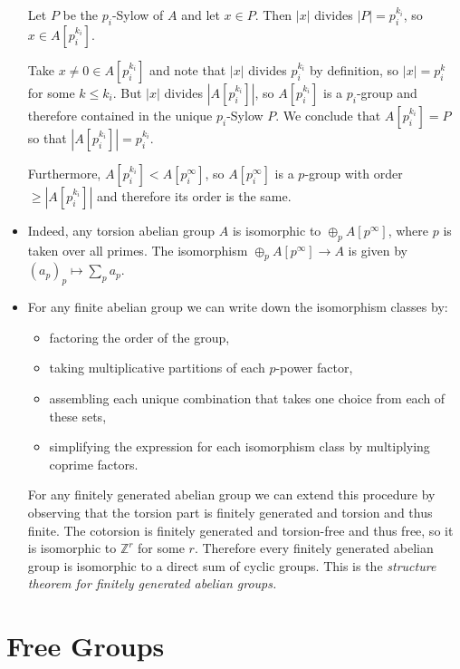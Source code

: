 \documentclass{article}
\begin{document}
\begin{itemize}
{    Let $P$ be the $p_i$-Sylow of $A$ and let $x \in P$. Then
    $|x|$ divides $|P| = p_i^{k_i}$, so $x \in A[p_i^{k_i}]$.

    Take $x \neq 0 \in A[p_i^{k_i}]$ and note that $|x|$ divides
    $p_i^{k_i}$ by definition, so $|x| = p_i^k$ for some
    $k \leq k_i$. But $|x|$ divides $|A[p_i^{k_i}]|$, so
    $A[p_i^{k_i}]$ is a $p_i$-group and therefore contained in the
    unique $p_i$-Sylow $P$. We conclude that $A[p_i^{k_i}] = P$ so
    that $|A[p_i^{k_i}]| = p_i^{k_i}$.

    Furthermore, $A[p_i^{k_i}] < A[p_i^\infty]$, so $A[p_i^\infty]$ is
    a $p$-group with order $\geq |A[p_i^{k_i}]|$ and therefore its
    order is the same.
  }
  \item{
    Indeed, any torsion abelian group $A$ is isomorphic to
    $\oplus_p A[p^\infty]$, where $p$ is taken over all primes. The
    isomorphism $\oplus_p A[p^\infty] \to A$ is given by
    $(a_p)_p \mapsto \sum_p a_p$.
  }
  \item{
    For any finite abelian group we can write down the isomorphism
    classes by:
    \begin{itemize}
      \item{factoring the order of the group,}
      \item{taking multiplicative partitions of each $p$-power
        factor,}
      \item{assembling each unique combination that takes one choice
        from each of these sets,}
      \item{simplifying the expression for each isomorphism class by
        multiplying coprime factors.}
    \end{itemize}

    For any finitely generated abelian group we can extend this
    procedure by observing that the torsion part is finitely generated
    and torsion and thus finite. The cotorsion is finitely generated
    and torsion-free and thus free, so it is isomorphic to
    $\mathbb{Z}^r$ for some $r$. Therefore every finitely generated
    abelian group is isomorphic to a direct sum of cyclic groups. This
    is the \emph{structure theorem for finitely generated abelian groups.}
  }
\end{itemize}

\section{Free Groups}
\end{document}
